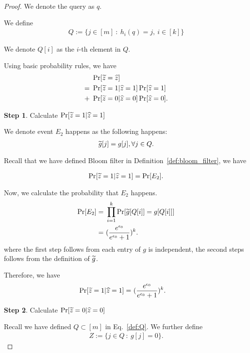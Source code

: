 \begin{proof}
We denote the query as $q$. 

We define
\begin{align}\label{def:Q}
    Q := \{j \in [m] ~:~ h_i(q) = j,~ i \in [k]\}
\end{align}



We denote $Q[i]$ as the $i$-th element in $Q$. 

Using basic probability rules, we have
\begin{align*}
    & ~ \Pr[\widetilde{z} = \widehat{z}] \\
    = & ~ \Pr[\widetilde{z} = 1 | \widehat{z} = 1] \Pr[\widehat{z} = 1] \\
    + & ~ \Pr[\widetilde{z} = 0 | \widehat{z} = 0] \Pr[\widehat{z} = 0].
\end{align*}

{\bf Step 1}. Calculate $\Pr[\widetilde{z} = 1 | \widehat{z} = 1]$


We denote event $E_2$ happens as the following happens:
\begin{align*}
    \widetilde{g}[j] = g[j], \forall j \in Q.
\end{align*}

Recall that we have defined Bloom filter in Definition~\ref{def:bloom_filter}, we have 

\begin{align*}
    \Pr[\widetilde{z} = 1 | \widehat{z} = 1] = \Pr[E_2].
\end{align*}

 
Now, we calculate the probability that $E_2$ happens. 
\begin{align*}
    \Pr [E_2] = & ~ \prod_{i = 1}^k \Pr [\widetilde{g}[Q[i]] = g[Q[i]]] \notag \\
    = & ~ (\frac{e^{\epsilon_0}}{e^{\epsilon_0} + 1})^k.
\end{align*}
where the first step follows from each entry of $g$ is independent, the second steps follows from the definition of $\widetilde{g}$. 

Therefore, we have
\begin{align}\label{eq:pr_wtz1_z1}
    \Pr[\widetilde{z} = 1 | \widehat{z} = 1] 
    = & ~ (\frac{e^{\epsilon_0}}{e^{\epsilon_0} + 1})^k.
\end{align}

{\bf Step 2}. Calculate $\Pr[\widetilde{z} = 0 | \widehat{z} = 0]$

Recall we have defined $Q \subset [m]$ in Eq.~\eqref{def:Q}. We further define
\begin{align*}
    Z := \{j \in Q ~:~ g[j] = 0\}.
\end{align*}


\end{proof}
